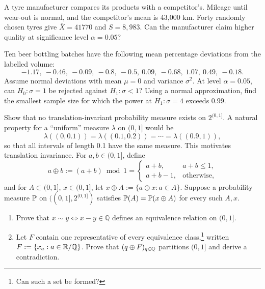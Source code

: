 \documentclass[a4paper]{report}
\begin{document}
\begin{problem}
A tyre manufacturer compares its products with a competitor's. Mileage until wear-out is normal, and the competitor's mean is 43,000 km. Forty randomly chosen tyres give $\overline X=41770$ and $S=8,983$. Can the manufacturer claim higher quality at significance level $\alpha=0.05$?
\end{problem}
\begin{problem}
Ten beer bottling batches have the following mean percentage deviations from the labelled volume:
\[-1.17,\ -0.46,\ -0.09,\ -0.8,\ -0.5,\ 0.09,\ -0.68,\ 1.07,\ 0.49,\ -0.18.\]
Assume normal deviations with mean $\mu=0$ and variance $\sigma^2$. At level $\alpha=0.05$, can $H_0:\sigma=1$ be rejected against $H_1:\sigma<1$? Using a normal approximation, find the smallest sample size for which the power at $H_1:\sigma=4$ exceeds 0.99.
\end{problem}
\par\noindent\hrulefill\par
\begin{problem}
Show that no translation-invariant probability measure exists on $2^{(0,1]}$. A natural property for a ``uniform'' measure $\lambda$ on $(0,1]$ would be
\[\lambda((0,0.1))=\lambda((0.1,0.2))=\cdots=\lambda((0.9,1)),\]
so that all intervals of length 0.1 have the same measure. This motivates translation invariance. For $a,b\in(0,1]$, define
\[a\oplus b:=(a+b)\bmod1=\begin{cases}a+b,&a+b\le1,\\a+b-1,&\text{otherwise},\end{cases}\]
and for $A\subset(0,1]$, $x\in(0,1]$, let $x\oplus A:=\{a\oplus x:a\in A\}$. Suppose a probability measure $\P$ on $((0,1],2^{(0,1]})$ satisfies $\P(A)=\P(x\oplus A)$ for every such $A,x$.
\begin{enumerate}
\item Prove that $x\sim y\iff x-y\in\mathbb Q$ defines an equivalence relation on $(0,1]$.
\item Let $F$ contain one representative of every equivalence class,\footnote{Can such a set be formed?} written $F:=\{x_a:a\in\R/\Q\}$. Prove that $(q\oplus F)_{q\in\Q}$ partitions $(0,1]$ and derive a contradiction.
\end{enumerate}
\end{problem}
\end{document}
